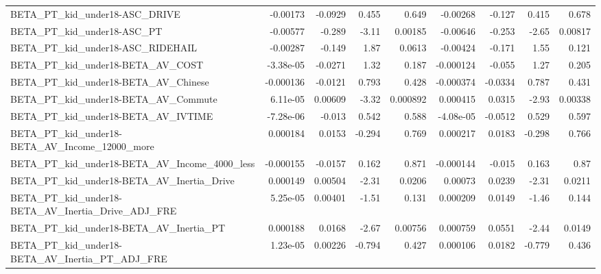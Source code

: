 \begin{tabular}{lrrrrrrrr}
BETA\_PT\_kid\_under18-ASC\_DRIVE                      &    -0.00173 &      -0.0929 &    0.455 &    0.649 &   -0.00268 &      -0.127 &        0.415 &         0.678 \\
BETA\_PT\_kid\_under18-ASC\_PT                         &    -0.00577 &       -0.289 &    -3.11 &  0.00185 &   -0.00646 &      -0.253 &        -2.65 &       0.00817 \\
BETA\_PT\_kid\_under18-ASC\_RIDEHAIL                   &    -0.00287 &       -0.149 &     1.87 &   0.0613 &   -0.00424 &      -0.171 &         1.55 &         0.121 \\
BETA\_PT\_kid\_under18-BETA\_AV\_COST                   &   -3.38e-05 &      -0.0271 &     1.32 &    0.187 &  -0.000124 &      -0.055 &         1.27 &         0.205 \\
BETA\_PT\_kid\_under18-BETA\_AV\_Chinese                &   -0.000136 &      -0.0121 &    0.793 &    0.428 &  -0.000374 &     -0.0334 &        0.787 &         0.431 \\
BETA\_PT\_kid\_under18-BETA\_AV\_Commute                &    6.11e-05 &      0.00609 &    -3.32 & 0.000892 &   0.000415 &      0.0315 &        -2.93 &       0.00338 \\
BETA\_PT\_kid\_under18-BETA\_AV\_IVTIME                 &   -7.28e-06 &       -0.013 &    0.542 &    0.588 &  -4.08e-05 &     -0.0512 &        0.529 &         0.597 \\
BETA\_PT\_kid\_under18-BETA\_AV\_Income\_12000\_more      &    0.000184 &       0.0153 &   -0.294 &    0.769 &   0.000217 &      0.0183 &       -0.298 &         0.766 \\
BETA\_PT\_kid\_under18-BETA\_AV\_Income\_4000\_less       &   -0.000155 &      -0.0157 &    0.162 &    0.871 &  -0.000144 &      -0.015 &        0.163 &          0.87 \\
BETA\_PT\_kid\_under18-BETA\_AV\_Inertia\_Drive          &    0.000149 &      0.00504 &    -2.31 &   0.0206 &    0.00073 &      0.0239 &        -2.31 &        0.0211 \\
BETA\_PT\_kid\_under18-BETA\_AV\_Inertia\_Drive\_ADJ\_FRE  &    5.25e-05 &      0.00401 &    -1.51 &    0.131 &   0.000209 &      0.0149 &        -1.46 &         0.144 \\
BETA\_PT\_kid\_under18-BETA\_AV\_Inertia\_PT             &    0.000188 &       0.0168 &    -2.67 &  0.00756 &   0.000759 &      0.0551 &        -2.44 &        0.0149 \\
BETA\_PT\_kid\_under18-BETA\_AV\_Inertia\_PT\_ADJ\_FRE     &    1.23e-05 &      0.00226 &   -0.794 &    0.427 &   0.000106 &      0.0182 &       -0.779 &         0.436 \\

\end{tabular}
